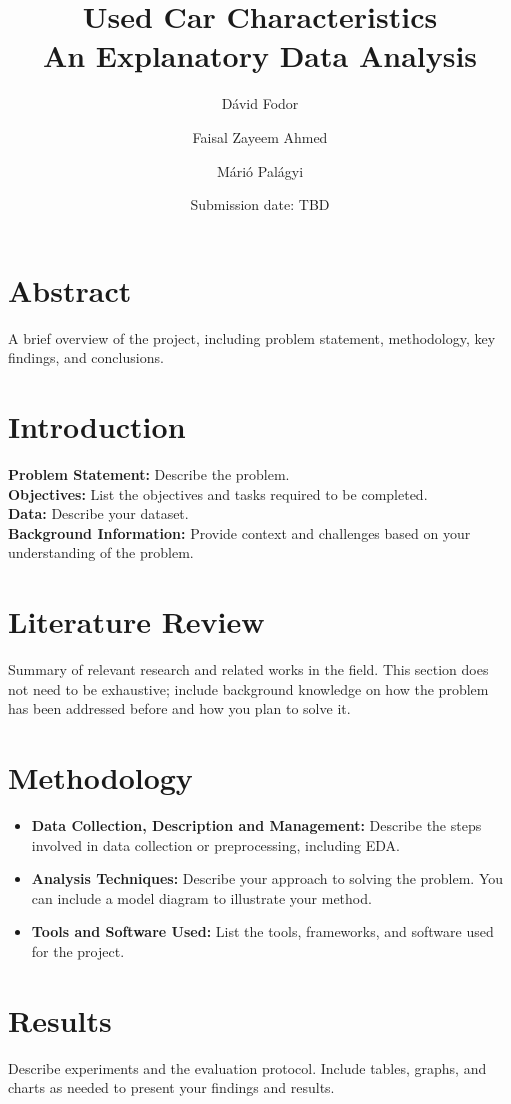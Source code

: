 \documentclass[12pt]{article}
\title{Used Car Characteristics \\ [0.2em]\large An Explanatory Data Analysis}
\author{Dávid Fodor \and Faisal Zayeem Ahmed \and Márió Palágyi}
\date{Submission date: TBD}
\begin{document}
\maketitle

\section*{Abstract}
A brief overview of the project, including problem statement, methodology, key findings, and conclusions.

\section{Introduction}
\textbf{Problem Statement:} Describe the problem.\\[1ex]
\textbf{Objectives:} List the objectives and tasks required to be completed.\\[1ex]
\textbf{Data:} Describe your dataset.\\[1ex]
\textbf{Background Information:} Provide context and challenges based on your understanding of the problem.

\section{Literature Review}
Summary of relevant research and related works in the field. This section does not need to be exhaustive; include background knowledge on how the problem has been addressed before and how you plan to solve it.

\section{Methodology}
\begin{itemize}
    \item \textbf{Data Collection, Description and Management:} Describe the steps involved in data collection or preprocessing, including EDA.
    \item \textbf{Analysis Techniques:} Describe your approach to solving the problem. You can include a model diagram to illustrate your method.
    \item \textbf{Tools and Software Used:} List the tools, frameworks, and software used for the project.
\end{itemize}

\section{Results}
Describe experiments and the evaluation protocol. Include tables, graphs, and charts as needed to present your findings and results.
\end{document}

